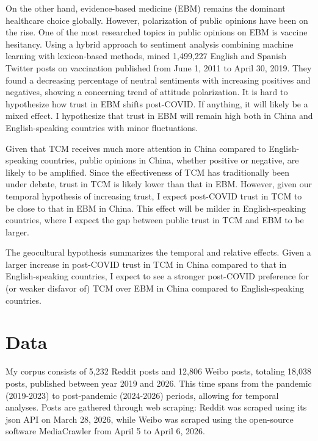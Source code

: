 \documentclass[11pt]{article}
\begin{document}
On the other hand, evidence-based medicine (EBM) remains the dominant healthcare choice globally. However, polarization of public opinions have been on the rise. One of the most researched topics in public opinions on EBM is vaccine hesitancy. Using a hybrid approach to sentiment analysis combining machine learning with lexicon-based methods, \textcite{piedrahitavalds_2021_vaccine} mined 1,499,227 English and Spanish Twitter posts on vaccination published from June 1, 2011 to April 30, 2019. They found a decreasing percentage of neutral sentiments with increasing positives and negatives, showing a concerning trend of attitude polarization. It is hard to hypothesize how trust in EBM shifts post-COVID. If anything, it will likely be a mixed effect. I hypothesize that trust in EBM will remain high both in China and English-speaking countries with minor fluctuations.

Given that TCM receives much more attention in China compared to English-speaking countries, public opinions in China, whether positive or negative, are likely to be amplified. Since the effectiveness of TCM has traditionally been under debate, trust in TCM is likely lower than that in EBM. However, given our temporal hypothesis of increasing trust, I expect post-COVID trust in TCM to be close to that in EBM in China. This effect will be milder in English-speaking countries, where I expect the gap between public trust in TCM and EBM to be larger.

The geocultural hypothesis summarizes the temporal and relative effects. Given a larger increase in post-COVID trust in TCM in China compared to that in English-speaking countries, I expect to see a stronger post-COVID preference for (or weaker disfavor of) TCM over EBM in China compared to English-speaking countries.

\section{Data}

My corpus consists of 5,232 Reddit posts and 12,806 Weibo posts, totaling 18,038 posts, published between year 2019 and 2026. This time spans from the pandemic (2019-2023) to post-pandemic (2024-2026) periods, allowing for temporal analyses. Posts are gathered through web scraping: Reddit was scraped using its json API on March 28, 2026, while Weibo was scraped using the open-source software MediaCrawler from April 5 to April 6, 2026.
\end{document}
